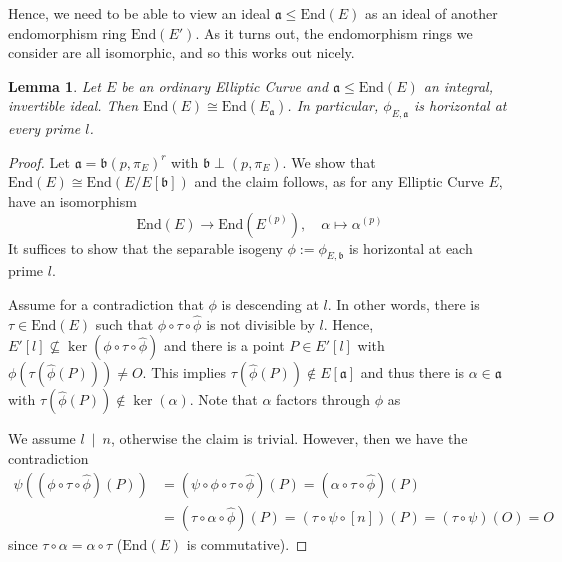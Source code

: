 \documentclass{ociamthesis}
\newcommand{\End}{\mathrm{End}}
\newcommand{\divides}{\ \mid \ }
\newcommand{\IdPoint}{O}
\renewcommand{\a}{\mathfrak{a}}
\renewcommand{\b}{\mathfrak{b}}
\newtheorem{lemma}[prop]{Lemma}
\theoremstyle{definition}
\begin{document}
Hence, we need to be able to view an ideal $\a \leq \End(E)$ as an ideal of another endomorphism ring $\End(E')$.
As it turns out, the endomorphism rings we consider are all isomorphic, and so this works out nicely. 
\begin{lemma}
    Let $E$ be an ordinary Elliptic Curve and $\a \leq \End(E)$ an integral, invertible ideal.
    Then $\End(E) \cong \End(E_\a)$.
    In particular, $\phi_{E, \a}$ is horizontal at every prime $l$.
\end{lemma}
\begin{proof}
    Let $\a = \b(p, \pi_E)^r$ with $\b \perp (p, \pi_E)$.
    We show that $\End(E) \cong \End(E/E[\b])$ and the claim follows, as for any Elliptic Curve $E$, have an isomorphism
    \begin{equation*}
        \End(E) \to \End(E^{(p)}), \quad \alpha \mapsto \alpha^{(p)}
    \end{equation*}
    It suffices to show that the separable isogeny $\phi := \phi_{E, \b}$ is horizontal at each prime $l$.

    Assume for a contradiction that $\phi$ is descending at $l$.
    In other words, there is $\tau \in \End(E)$ such that $\phi \circ \tau \circ \hat{\phi}$ is not divisible by $l$.
    Hence, $E'[l] \not\subseteq \ker(\phi \circ \tau \circ \hat{\phi})$ and there is a point $P \in E'[l]$ with $\phi(\tau(\hat{\phi}(P))) \neq \IdPoint$.
    This implies $\tau(\hat{\phi}(P)) \notin E[\a]$ and thus there is $\alpha \in \a$ with $\tau(\hat{\phi}(P)) \notin \ker(\alpha)$.
    Note that $\alpha$ factors through $\phi$ as
    \begin{center}
    \end{center}
    We assume $l \divides n$, otherwise the claim is trivial.
    However, then we have the contradiction
    \begin{align*}
        \psi((\phi \circ \tau \circ \hat{\phi})(P)) &= (\psi \circ \phi \circ \tau \circ \hat{\phi})(P) = (\alpha \circ \tau \circ \hat{\phi})(P) \\
        &= (\tau \circ \alpha \circ \hat{\phi})(P) = (\tau \circ \psi \circ [n])(P) = (\tau \circ \psi)(\IdPoint) = \IdPoint
    \end{align*}
    since $\tau \circ \alpha = \alpha \circ \tau$ ($\End(E)$ is commutative).
\end{proof}
\end{document}
